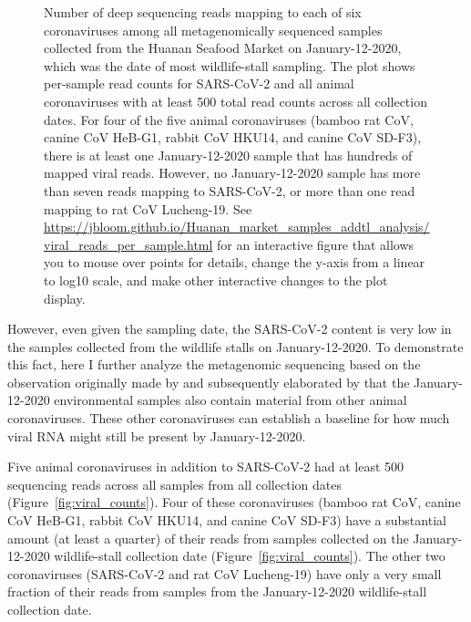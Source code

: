 \documentclass[9pt,onecolumn,twoside]{gsajnl_modified}
\begin{document}
\begin{figure*}[b]
\caption{
Number of deep sequencing reads mapping to each of six coronaviruses among all metagenomically sequenced samples collected from the Huanan Seafood Market on January-12-2020, which was the date of most wildlife-stall sampling.
The plot shows per-sample read counts for SARS-CoV-2 and all animal coronaviruses with at least 500 total read counts across all collection dates.
For four of the five animal coronaviruses (bamboo rat CoV, canine CoV HeB-G1, rabbit CoV HKU14, and canine CoV SD-F3), there is at least one January-12-2020 sample that has hundreds of mapped viral reads.
However, no January-12-2020 sample has more than seven reads mapping to SARS-CoV-2, or more than one read mapping to rat CoV Lucheng-19.
See \url{https://jbloom.github.io/Huanan_market_samples_addtl_analysis/viral_reads_per_sample.html} for an interactive figure that allows you to mouse over points for details, change the y-axis from a linear to log10 scale, and make other interactive changes to the plot display.
\label{fig:viral_reads}
}
\end{figure*}

However, even given the sampling date, the SARS-CoV-2 content is very low in the samples collected from the wildlife stalls on January-12-2020.
To demonstrate this fact, here I further analyze the metagenomic sequencing based on the observation originally made by \citet{massey2023animal} and subsequently elaborated by \citet{christoph2023genetic} that the January-12-2020 environmental samples also contain material from other animal coronaviruses.
These other coronaviruses can establish a baseline for how much viral RNA might still be present by January-12-2020.

Five animal coronaviruses in addition to SARS-CoV-2 had at least 500 sequencing reads across all samples from all collection dates (Figure~\ref{fig:viral_counts}).
Four of these coronaviruses (bamboo rat CoV, canine CoV HeB-G1, rabbit CoV HKU14, and canine CoV SD-F3) have a substantial amount (at least a quarter) of their reads from samples collected on the January-12-2020 wildlife-stall collection date (Figure~\ref{fig:viral_counts}).
The other two coronaviruses (SARS-CoV-2 and rat CoV Lucheng-19) have only a very small fraction of their reads from samples from the January-12-2020 wildlife-stall collection date.
\end{document}
